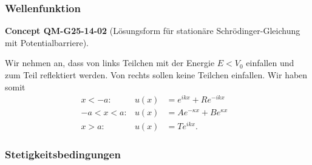 \documentclass[10pt, letterpaper]{article}
\newcommand{\CustomHeading}[3]{%
  \par\medskip\noindent%
  \textbf{#1 #2} \textnormal{(#3)}.\enskip%
}
\newenvironment{CONC}[2]{\begin{unitbox}\CustomHeading{Concept}{#1}{#2}}{\end{unitbox}}
\begin{document}
\subsubsection*{Wellenfunktion}


\begin{CONC}{QM-G25-14-02}{Lösungsform für stationäre Schrödinger-Gleichung mit Potentialbarriere}
Wir nehmen an, dass von links Teilchen mit der Energie $E<V_{0}$ einfallen und zum Teil reflektiert werden. Von rechts sollen keine Teilchen einfallen. Wir haben somit
$$
\begin{aligned}
x<-a: & u(x) & =e^{i k x}+R e^{-i k x} & \\
-a<x<a: & u(x) & =A e^{-\kappa x}+B e^{\kappa x} & \\
x>a: & u(x) & =T e^{i k x} . &
\end{aligned}
$$
\end{CONC}


\subsubsection*{Stetigkeitsbedingungen}
\end{document}

